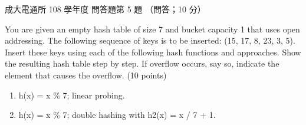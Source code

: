 \begin{pastexam}[label={px:ncku-108-comm-ds-08}]{成大電通所 108 學年度 問答題第 5 題}
（問答；10 分）

You are given an empty hash table of size 7 and bucket capacity 1 that uses open addressing. The
following sequence of keys is to be inserted: (15, 17, 8, 23, 3, 5). Insert these keys using each of the
following hash functions and approaches. Show the resulting hash table step by step. If overflow occurs,
say so, indicate the element that causes the overflow. (10 points)
\begin{enumerate}[label=(\Alph*)]
\item h(x) = x \% 7; linear probing.
\item h(x) = x \% 7; double hashing with h2(x) = x / 7 + 1.
\end{enumerate}
\end{pastexam}

